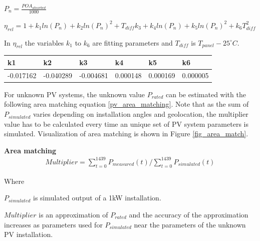 $P_n = \frac{POA_{absorbed}}{1000}$


$\eta_{rel}= 1+k_1 ln(P_n) + k_2 ln(P_n)^2 + T_{diff}k_3 + k_4 ln(P_n) + k_5 ln(P_n)^2 + k_6 T_{diff}^2$

In $\eta_{rel}$ the variables $k_1$ to $k_6$ are fitting parameters and $T_{diff}$ is $T_{panel}-25^\circ C$.

\begin{table}[h]
\begin{tabular}{l|l|l|l|l|l}
k1        & k2        & k3        & k4       & k5       & k6       \\ \hline
-0.017162 & -0.040289 & -0.004681 & 0.000148 & 0.000169 & 0.000005
\end{tabular}
\end{table}

\noindent %
For unknown PV systems, the unknown value $P_{rated}$ can be estimated with the following area matching equation \ref{pv_area_matching}. Note that as the sum of $P_{simulated}$ varies depending on installation angles and geolocation, the multiplier value has to be calculated every time an unique set of PV system parameters is simulated. Visualization of area matching is shown in Figure \ref{fig_area_match}.




\noindent\textbf{Area matching}
\begin{equation}
\begin{split}
\label{pv_area_matching}
Multiplier = \sum_{t=0}^{1439} P_{measured}(t)/ \sum_{t=0}^{1439} P_{simulated}(t)
\end{split}
\end{equation}

\noindent Where

$P_{simulated}$ is simulated output of a 1kW installation.

$Multiplier$ is an approximation of $P_{rated}$ and the accuracy of the approximation increases as parameters used for $P_{simulated}$ near the parameters of the unknown PV installation.



